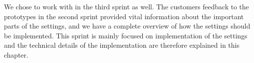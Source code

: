 We chose to work with \launcher in the third sprint as well.
The customers feedback to the prototypes in the second sprint provided vital information about the important parts of the settings, and we have a complete overview of how the settings should be implemented.
This sprint is mainly focused on implementation of the settings and the technical details of the implementation are therefore explained in this chapter.